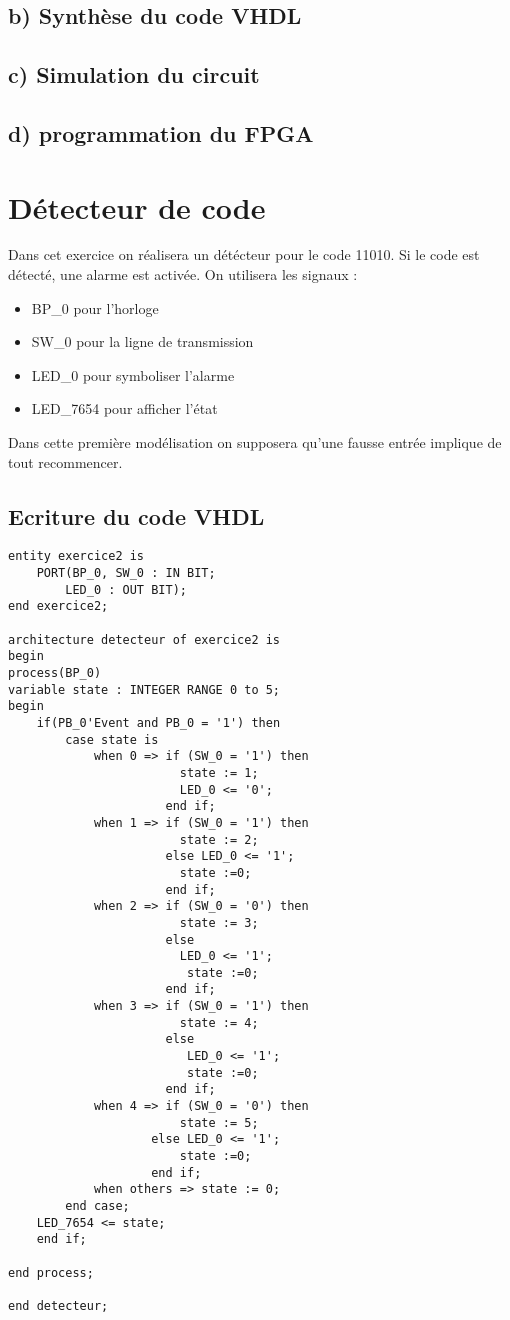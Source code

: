 \documentclass[11pt]{report}
\begin{document}
 \subsection{ b) Synthèse du code VHDL }
 
  \subsection{ c) Simulation du circuit}
  
   \subsection{ d) programmation du FPGA}
   
   
 

\section{Détecteur de code}

Dans cet exercice on réalisera un détécteur pour le code 11010. Si le code est détecté, une alarme est activée. On utilisera les signaux :
\begin{itemize}
	\item BP\_0 pour l'horloge
	\item SW\_0 pour la ligne de transmission
	\item LED\_0 pour symboliser l'alarme
	\item LED\_7654 pour afficher l'état

\end{itemize}

Dans cette première modélisation on supposera qu'une fausse entrée implique de tout recommencer. 

\subsection{Ecriture du code VHDL}

\begin{lstlisting}
entity exercice2 is
	PORT(BP_0, SW_0 : IN BIT;
		LED_0 : OUT BIT);
end exercice2;

architecture detecteur of exercice2 is
begin
process(BP_0)
variable state : INTEGER RANGE 0 to 5;
begin
	if(PB_0'Event and PB_0 = '1') then
		case state is
			when 0 => if (SW_0 = '1') then 
						state := 1; 
						LED_0 <= '0'; 
					  end if;
			when 1 => if (SW_0 = '1') then 
						state := 2; 
					  else LED_0 <= '1'; 
						state :=0; 
					  end if;
			when 2 => if (SW_0 = '0') then 
						state := 3; 
					  else 
					  	LED_0 <= '1';
					  	 state :=0; 
					  end if;
			when 3 => if (SW_0 = '1') then 
						state := 4; 
					  else
					  	 LED_0 <= '1'; 
					  	 state :=0; 
					  end if;
			when 4 => if (SW_0 = '0') then 
						state := 5; 
					else LED_0 <= '1'; 
						state :=0;
					end if;
			when others => state := 0;
		end case;
	LED_7654 <= state;
	end if;

end process;

end detecteur;

\end{lstlisting}
\end{document}
